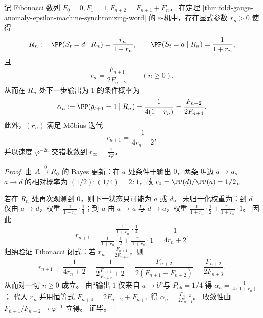 \begin{theorem}\label{thm:fold-gauge-anomaly-epsilon-machine-fibonacci-mobius}
记 Fibonacci 数列 \(F_0=0,F_1=1,F_{n+2}=F_{n+1}+F_n\)。
在定理 \ref{thm:fold-gauge-anomaly-epsilon-machine-synchronizing-word} 的 \(\varepsilon\)-机中，存在显式参数 \(r_n>0\) 使得
\[
R_n:\quad \PP(S_t=d\mid R_n)=\frac{r_n}{1+r_n},\qquad
\PP(S_t=a\mid R_n)=\frac{1}{1+r_n},
\]
且
\[
r_n=\frac{F_{n+1}}{2F_{n+2}}\qquad(n\ge 0).
\]
从而在 \(R_n\) 处下一步输出为 \(1\) 的条件概率为
\[
\alpha_n:=\PP(g_{t+1}=1\mid R_n)=\frac{1}{4(1+r_n)}=\frac{F_{n+2}}{2F_{n+4}}.
\]
此外，\((r_n)\) 满足 M\"obius 迭代
\[
r_{n+1}=\frac{1}{4r_n+2},
\]
并以速度 \(\varphi^{-2n}\) 交错收敛到 \(r_\infty=\frac1{2\varphi}\)。
\end{theorem}
\begin{proof}
由 \(A\xrightarrow{0}R_0\) 的 Bayes 更新：在 \(a\) 处条件于输出 \(0\)，两条 \(0\)-边 \(a\to a\)、\(a\to d\) 的相对概率为 \((1/2):(1/4)=2:1\)，故 \(r_0=\PP(d)/\PP(a)=1/2\)。
\par
若在 \(R_n\) 处再次观测到 \(0\)，则下一状态只可能为 \(a\) 或 \(d\)。
未归一化权重为：到 \(d\) 仅由 \(a\to d\)，权重 \(\frac{1}{1+r_n}\cdot\frac14\)；到 \(a\) 由 \(a\to a\) 与 \(d\to a\)，权重 \(\frac{1}{1+r_n}\cdot\frac12+\frac{r_n}{1+r_n}\cdot 1\)。
因此
\[
r_{n+1}
=\frac{\frac{1}{1+r_n}\cdot \frac14}{\frac{1}{1+r_n}\cdot\frac12+\frac{r_n}{1+r_n}\cdot 1}
=\frac{1}{4r_n+2}.
\]
归纳验证 Fibonacci 闭式：若 \(r_n=\frac{F_{n+1}}{2F_{n+2}}\)，则
\[
r_{n+1}=\frac{1}{4r_n+2}
=\frac{1}{2\frac{F_{n+1}}{F_{n+2}}+2}
=\frac{F_{n+2}}{2(F_{n+1}+F_{n+2})}
=\frac{F_{n+2}}{2F_{n+3}}.
\]
从而对一切 \(n\ge 0\) 成立。
由“输出 \(1\) 仅来自 \(a\to b\)”与 \(P_{ab}=1/4\) 得 \(\alpha_n=\frac{1}{4(1+r_n)}\)；
代入 \(r_n\) 并用恒等式 \(F_{n+4}=2F_{n+2}+F_{n+1}\) 得 \(\alpha_n=\frac{F_{n+2}}{2F_{n+4}}\)。
收敛性由 \(F_{n+1}/F_{n+2}\to\varphi^{-1}\) 立得。
证毕。
\end{proof}

